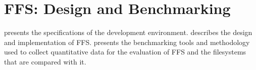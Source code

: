 
\chapter{FFS: Design and Benchmarking}
\label{ch:methods}

 presents the specifications of the development environment.  describes the design and implementation of \gls{FFS}.  presents the benchmarking tools and methodology used to collect quantitative data for the evaluation of \gls{FFS} and the filesystems that are compared with it.





